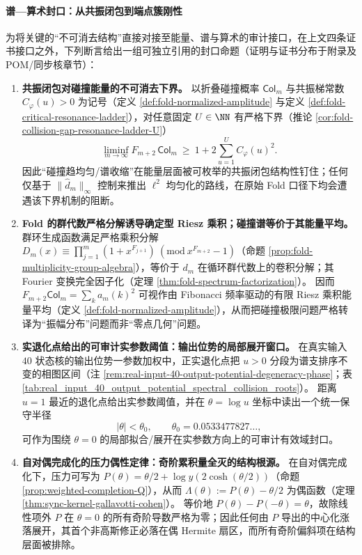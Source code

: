 \paragraph{谱—算术封口：从共振闭包到端点簇刚性}
为将关键的“不可消去结构”直接对接至能量、谱与算术的审计接口，在上文四条证书接口之外，下列断言给出一组可独立引用的封口命题（证明与证书分布于附录及 POM/同步核章节）：
\begin{enumerate}
  \item \textbf{共振闭包对碰撞能量的不可消去下界。}
  以折叠碰撞概率 \(\mathsf{Col}_m\) 与共振梯常数 \(C_\varphi(u)>0\) 为记号（定义 \ref{def:fold-normalized-amplitude} 与定义 \ref{def:fold-critical-resonance-ladder}），对任意固定 \(U\in\NN\) 有严格下界（推论 \ref{cor:fold-collision-gap-resonance-ladder-U}）
  \[
  \liminf_{m\to\infty}F_{m+2}\,\mathsf{Col}_m\ \ge\ 1+2\sum_{u=1}^{U}C_\varphi(u)^2.
  \]
  因此“碰撞趋均匀/谱收缩”在能量层面被可枚举的共振闭包结构性钉住；任何仅基于 \(\|\widehat d_m\|_\infty\) 控制来推出 \(\ell^2\) 均匀化的路线，在原始 Fold 口径下均会遭遇该下界机制的阻断。

  \item \textbf{Fold 的群代数严格分解诱导确定型 Riesz 乘积；碰撞谱等价于其能量平均。}
  群环生成函数满足严格乘积分解 \(D_m(x)\equiv\prod_{j=1}^m(1+x^{F_{j+1}})\ (\mathrm{mod}\ x^{F_{m+2}}-1)\)（命题 \ref{prop:fold-multiplicity-group-algebra}），等价于 \(d_m\) 在循环群代数上的卷积分解；其 Fourier 变换完全因子化（定理 \ref{thm:fold-spectrum-factorization}）。
  因而
  \(
  F_{m+2}\mathsf{Col}_m=\sum_k a_m(k)^2
  \)
  可视作由 Fibonacci 频率驱动的有限 Riesz 乘积能量平均（定义 \ref{def:fold-normalized-amplitude}），从而把碰撞极限问题严格转译为“振幅分布”问题而非“零点几何”问题。

  \item \textbf{实退化点给出的可审计实参数阈值：输出位势的局部展开窗口。}
  在真实输入 \(40\) 状态核的输出位势一参数加权中，正实退化点把 \(u>0\) 分段为谱支排序不变的相图区间（注 \ref{rem:real-input-40-output-potential-degeneracy-phase}；表 \ref{tab:real_input_40_output_potential_spectral_collision_roots}）。
  距离 \(u=1\) 最近的退化点给出实参数阈值，并在 \(\theta=\log u\) 坐标中读出一个统一保守半径
  \[
  |\theta|<\theta_0,\qquad \theta_0=0.0533477827\ldots,
  \]
  可作为围绕 \(\theta=0\) 的局部拟合/展开在实参数方向上的可审计有效域封口。

  \item \textbf{自对偶完成化的压力偶性定律：奇阶累积量全灭的结构根源。}
  在自对偶完成化下，压力可写为 \(P(\theta)=\theta/2+\log y(2\cosh(\theta/2))\)（命题 \ref{prop:weighted-completion-Q}），从而 \(\Lambda(\theta):=P(\theta)-\theta/2\) 为偶函数（定理 \ref{thm:sync-kernel-gallavotti-cohen}）。
  等价地 \(P(\theta)-P(-\theta)=\theta\)，故除线性项外 \(P\) 在 \(\theta=0\) 的所有奇阶导数严格为零；因此任何由 \(P\) 导出的中心化涨落展开，其首个非高斯修正必落在偶 Hermite 扇区，而所有奇阶偏斜项在结构层面被排除。


\end{enumerate}
